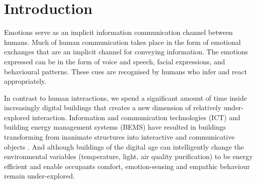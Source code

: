 \documentclass[manuscript, anonymous, review]{acmart}
\begin{document}



 
\maketitle

\section{Introduction}

Emotions serve as an implicit information communication channel between humans. Much of human communication takes place in the form of emotional exchanges that are an implicit channel for conveying information. The emotions expressed can be in the form of voice and speech, facial expressions, and behavioural patterns. These cues are recognised by humans who infer and react appropriately.

In contrast to human interactions, we spend a significant amount of time inside increasingly digital buildings that creates a new dimension of relatively under-explored interaction. Information and communication technologies (ICT) and building energy management systems (BEMS) have resulted in buildings transforming from inanimate structures into interactive and communicative objects \cite{nembrini2017human}. And although buildings of the digital age can intelligently change the environmental variables (temperature, light, air quality purification) to be energy efficient and enable occupants comfort, emotion-sensing and empathic behaviour remain under-explored. 
\end{document}
